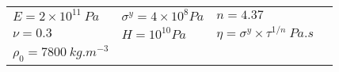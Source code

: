   \begin{tabular}{l|l|lN}
    \hline
    $E=2\times 10^{11}\:Pa$ & $\sigma^y=4 \times 10^8 Pa$ & $n=4.37$&  \\ [3pt]
    $\nu=0.3$ & $H=10^{10} Pa$ & $\eta=\sigma^y \times \tau^{1/n} \: Pa.s$ & \\[3pt]
    $\rho_0 = 7800 \: kg.m^{-3}$ & & &\\[3pt]
    \hline
  \end{tabular}


